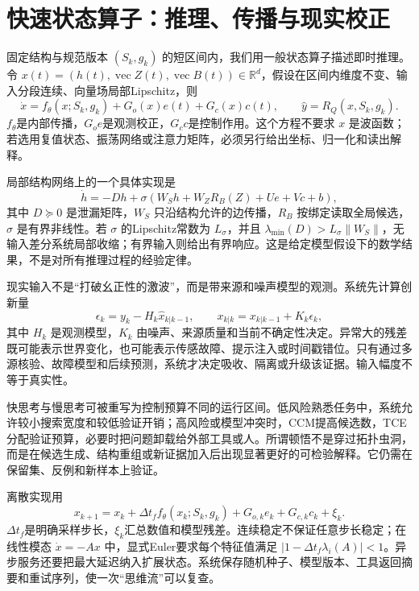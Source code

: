 \section{快速状态算子：推理、传播与现实校正}
\label{sec:section_7654}

固定结构与规范版本 $(S_k,g_k)$ 的短区间内，我们用一般状态算子描述即时推理。令 $x(t)=(h(t),\operatorname{vec}Z(t),\operatorname{vec}B(t))\in\mathbb R^d$，假设在区间内维度不变、输入分段连续、向量场局部Lipschitz，则
\begin{equation}
\dot x=f_{\theta}(x;S_k,g_k)+G_o(x)e(t)+G_c(x)c(t),\qquad \hat y=R_Q(x,S_k,g_k).
\end{equation}
$f_\theta$是内部传播，$G_o e$是观测校正，$G_c c$是控制作用。这个方程不要求 $x$ 是波函数；若选用复值状态、振荡网络或注意力矩阵，必须另行给出坐标、归一化和读出解释。

局部结构网络上的一个具体实现是
\begin{equation}
\dot h=-Dh+\sigma\!\left(W_Sh+W_ZR_B(Z)+Ue+Vc+b\right),
\end{equation}
其中 $D\succeq0$ 是泄漏矩阵，$W_S$ 只沿结构允许的边传播，$R_B$ 按绑定读取全局候选，$\sigma$ 是有界非线性。若 $\sigma$ 的Lipschitz常数为 $L_\sigma$，并且 $\lambda_{\min}(D)>L_\sigma\|W_S\|$，无输入差分系统局部收缩；有界输入则给出有界响应。这是给定模型假设下的数学结果，不是对所有推理过程的经验定律。

现实输入不是“打破幺正性的激波”，而是带来源和噪声模型的观测。系统先计算创新量
\begin{equation}
\epsilon_k=y_k-H_k\hat x_{k|k-1},\qquad x_{k|k}=x_{k|k-1}+K_k\epsilon_k,
\end{equation}
其中 $H_k$ 是观测模型，$K_k$ 由噪声、来源质量和当前不确定性决定。异常大的残差既可能表示世界变化，也可能表示传感故障、提示注入或时间戳错位。只有通过多源核验、故障模型和后续预测，系统才决定吸收、隔离或升级该证据。输入幅度不等于真实性。

快思考与慢思考可被重写为控制预算不同的运行区间。低风险熟悉任务中，系统允许较小搜索宽度和较低验证开销；高风险或模型冲突时，CCM提高候选数，TCE分配验证预算，必要时把问题卸载给外部工具或人。所谓顿悟不是穿过拓扑虫洞，而是在候选生成、结构重组或新证据加入后出现显著更好的可检验解释。它仍需在保留集、反例和新样本上验证。

离散实现用
\begin{equation}
x_{k+1}=x_k+\Delta t_f f_\theta(x_k;S_k,g_k)+G_{o,k}e_k+G_{c,k}c_k+\xi_k .
\end{equation}
$\Delta t_f$是明确采样步长，$\xi_k$汇总数值和模型残差。连续稳定不保证任意步长稳定；在线性模态 $\dot x=-Ax$ 中，显式Euler要求每个特征值满足 $|1-\Delta t_f\lambda_i(A)|<1$。异步服务还要把最大延迟纳入扩展状态。系统保存随机种子、模型版本、工具返回摘要和重试序列，使一次“思维流”可以复查。

